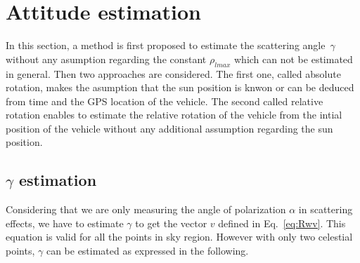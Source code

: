 \graphicspath{{./content/intro/figures/}}

\section{Attitude estimation}
\label{sec:g-abs-rel}
In this section, a method is first proposed to estimate the scattering angle~$\gamma$ 
without any asumption regarding the constant $\rho_{lmax}$ which can not be estimated in general.
Then two approaches are considered. The first one, called absolute rotation, makes the asumption
that the sun position is knwon or can be deduced from time and the GPS location of the vehicle. The second 
called relative rotation enables to estimate the relative rotation of the vehicle from the intial position of the vehicle without any additional assumption regarding the sun position. 


\subsection{$\gamma$ estimation}
\label{sec:gamma}
Considering that we are only measuring the angle of polarization $\alpha$
in scattering effects, we have to estimate $\gamma$ to get the vector
$v$ defined in Eq.~\ref{eq:Rwv}. This equation is valid for all the points in
sky region. However with only two celestial points, $\gamma$ can be estimated as
expressed in the following.

